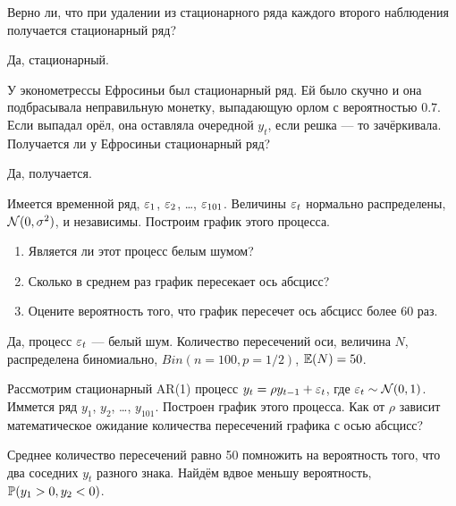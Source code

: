 \begin{problem}
Верно ли, что при удалении из стационарного ряда каждого второго наблюдения получается стационарный ряд?
\begin{sol}
Да, стационарный.
\end{sol}
\end{problem}



\begin{problem}
У эконометрессы Ефросиньи был стационарный ряд.
Ей было скучно и она подбрасывала неправильную монетку, выпадающую орлом с вероятностью $0.7$.
Если выпадал орёл, она оставляла очередной $y_t$, если решка — то зачёркивала.
Получается ли у Ефросиньи стационарный ряд?
\begin{sol}
Да, получается.
\end{sol}
\end{problem}


\begin{problem}
Имеется временной ряд, $\e_1$, $\e_2$, \ldots, $\e_{101}$. Величины $\e_t$ нормально распределены, $\cN(0,\sigma^2)$, и независимы. Построим график этого процесса.
\begin{enumerate}
\item Является ли этот процесс белым шумом?
\item Сколько в среднем раз график пересекает ось абсцисс?
\item Оцените вероятность того, что график пересечет ось абсцисс более 60 раз.
\end{enumerate}



\begin{sol}
Да, процесс $\e_t$ — белый шум. Количество пересечений оси, величина $N$, распределена биномиально,
$Bin(n = 100, p = 1/2)$, $\E(N) = 50$.
\end{sol}
\end{problem}


\begin{problem}
Рассмотрим стационарный AR(1) процесс $y_t=\rho y_{t-1} + \e_t$, где $\e_t \sim \cN(0,1)$. Иммется ряд $y_1$, $y_2$, \ldots, $y_{101}$. Построен график этого процесса. Как от $\rho$ зависит математическое ожидание количества пересечений графика с осью абсцисс?

\begin{sol}
Среднее количество пересечений равно 50 помножить на вероятность того, что два соседних $y_t$ разного знака. Найдём вдвое меньшу вероятность, $\P(y_1>0, y_2 <0)$.
\end{sol}
\end{problem}



